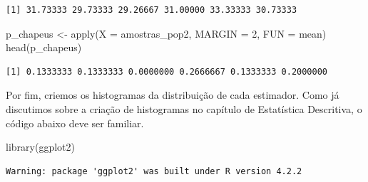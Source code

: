 \documentclass[
  letterpaper,
  DIV=11,
  numbers=noendperiod]{scrreprt}
\newenvironment{Shaded}{\begin{snugshade}}{\end{snugshade}}
\newcommand{\AttributeTok}[1]{\textcolor[rgb]{0.40,0.45,0.13}{#1}}
\newcommand{\DecValTok}[1]{\textcolor[rgb]{0.68,0.00,0.00}{#1}}
\newcommand{\FunctionTok}[1]{\textcolor[rgb]{0.28,0.35,0.67}{#1}}
\newcommand{\NormalTok}[1]{\textcolor[rgb]{0.00,0.23,0.31}{#1}}
\newcommand{\OtherTok}[1]{\textcolor[rgb]{0.00,0.23,0.31}{#1}}
\begin{document}
\begin{verbatim}
[1] 31.73333 29.73333 29.26667 31.00000 33.33333 30.73333
\end{verbatim}

\begin{Shaded}
\begin{Highlighting}[]
\NormalTok{p\_chapeus }\OtherTok{\textless{}{-}} \FunctionTok{apply}\NormalTok{(}\AttributeTok{X =}\NormalTok{ amostras\_pop2, }\AttributeTok{MARGIN =} \DecValTok{2}\NormalTok{, }\AttributeTok{FUN =}\NormalTok{ mean)}
\FunctionTok{head}\NormalTok{(p\_chapeus)}
\end{Highlighting}
\end{Shaded}

\begin{verbatim}
[1] 0.1333333 0.1333333 0.0000000 0.2666667 0.1333333 0.2000000
\end{verbatim}

Por fim, criemos os histogramas da distribuição de cada estimador. Como
já discutimos sobre a criação de histogramas no capítulo de Estatística
Descritiva, o código abaixo deve ser familiar.

\begin{Shaded}
\begin{Highlighting}[]
\FunctionTok{library}\NormalTok{(ggplot2)}
\end{Highlighting}
\end{Shaded}

\begin{verbatim}
Warning: package 'ggplot2' was built under R version 4.2.2
\end{verbatim}
\end{document}
